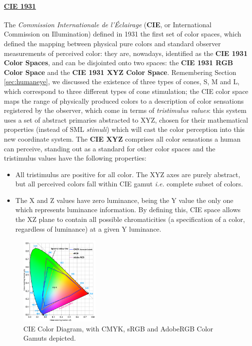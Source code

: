 \paragraph{\ul{CIE 1931}} The \emph{Commission Internationale de l’Éclairage} (\textbf{CIE}, or
International Commission on Illumination) defined in 1931 the first set of color spaces, which defined the
mapping between physical pure colors and standard observer measurements of perceived color: they are,
nowadays, identified as the \textbf{CIE 1931 Color Spaces}, and can be disjointed onto two spaces: the
\textbf{CIE 1931 RGB Color Space} and the \textbf{CIE 1931 XYZ Color Space}. Remembering Section \ref{sec:humaneye},
we discussed the existence of three types of cones, S, M and L, which correspond to three different types
of cone stimulation; the CIE color space maps the range of physically produced colors to a description of color
sensations registered by the observer, which come in terms of \emph{tristimulus values}: this system uses
a set of abstract primaries abstracted to XYZ, chosen for their mathematical properties (instead of SML
\emph{stimuli}) which will cast the color perception into this new coordinate system.
The \textbf{CIE XYZ} comprises all color sensations a human can perceive, standing out as a standard for
other color spaces and the tristimulus values have the following properties:
%
\begin{itemize}
	\setlength\itemsep{0.01em}
	\item All tristimulus are positive for all color. The XYZ axes are purely abstract, but all perceived
	colors fall within CIE gamut \emph{i.e.} complete subset of colors.
	\item The X and Z values have zero luminance, being the Y value the only one which represents luminance
	information. By defining this, CIE space allows the XZ plane to contain all possible chromaticities
	(a specification of a color, regardless of luminance) at a given Y luminance.
\end{itemize} \par
%
\begin{figure}[htbp]
  \centering
  \vspace{-15pt}
  \includegraphics[width=0.35\textwidth]{images/background/CIE_RGB_CMYK.jpg}
  \caption[CIE Horseshoe with AdobeRGB, sRGB and CMYK Gamuts]{CIE Color Diagram, with CMYK, sRGB and AdobeRGB Color Gamuts depicted.\protect\footnotemark{}}
  \vspace{-10pt}
  \label{fig:cie}
\end{figure}
